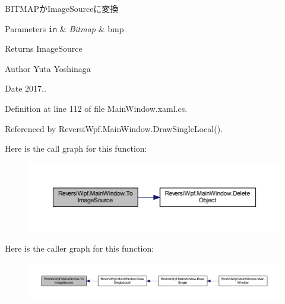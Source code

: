 B\+I\+T\+M\+A\+Pか\+Image\+Sourceに変換 


\begin{DoxyParams}[1]{Parameters}
\mbox{\tt in}  & {\em Bitmap} & bmp \\
\hline
\end{DoxyParams}
\begin{DoxyReturn}{Returns}
Image\+Source 
\end{DoxyReturn}
\begin{DoxyAuthor}{Author}
Yuta Yoshinaga 
\end{DoxyAuthor}
\begin{DoxyDate}{Date}
2017.. 
\end{DoxyDate}


Definition at line 112 of file Main\+Window.\+xaml.\+cs.



Referenced by Reversi\+Wpf.\+Main\+Window.\+Draw\+Single\+Local().

Here is the call graph for this function\+:
\nopagebreak
\begin{figure}[H]
\begin{center}
\leavevmode
\includegraphics[width=350pt]{class_reversi_wpf_1_1_main_window_a5c093af07e7e92f21127941dff8e8684_cgraph}
\end{center}
\end{figure}
Here is the caller graph for this function\+:
\nopagebreak
\begin{figure}[H]
\begin{center}
\leavevmode
\includegraphics[width=350pt]{class_reversi_wpf_1_1_main_window_a5c093af07e7e92f21127941dff8e8684_icgraph}
\end{center}
\end{figure}
\mbox{\label{class_reversi_wpf_1_1_main_window_aa776c697ed89869c9799576f2f6022b9}} 
